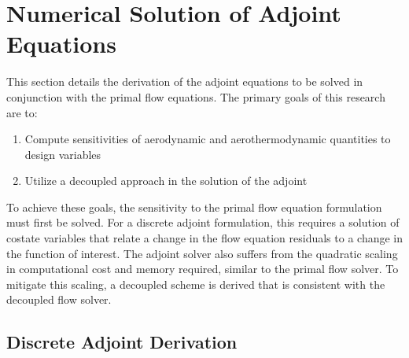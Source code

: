 \chapter{Numerical Solution of Adjoint Equations}
\label{chapter-four}

This section details the derivation of the adjoint equations to be solved in
conjunction with the primal flow equations.  The primary goals of this research
are to:
\begin{enumerate}
  \item Compute sensitivities of aerodynamic and aerothermodynamic quantities to
    design variables
  \item Utilize a decoupled approach in the solution of the adjoint
\end{enumerate}
To achieve these goals, the sensitivity to the primal flow equation formulation
must first be solved.  For a discrete adjoint formulation, this requires a
solution of costate variables that relate a change in the flow equation
residuals to a change in the function of interest.  The adjoint solver also
suffers from the quadratic scaling in computational cost and memory required,
similar to the primal flow solver.  To mitigate this scaling, a decoupled scheme
is derived that is consistent with the decoupled flow solver.

\section{Discrete Adjoint Derivation}
\label{sec:adj-derivation}

